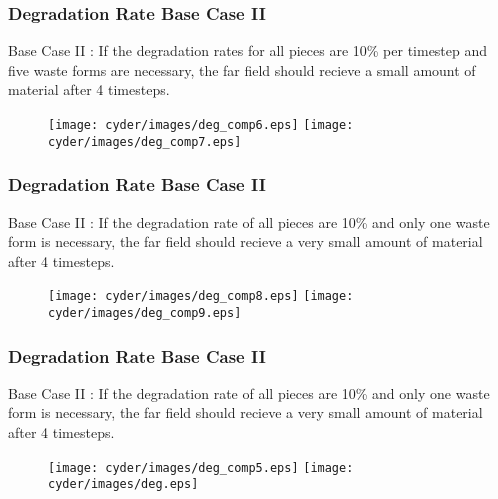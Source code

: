 \begin{frame}
  \frametitle{Degradation Rate Base Case II}
  Base Case II : If the degradation rates for all pieces are 10\% per timestep and 
  five waste forms are necessary, the far field should recieve a  small amount
  of material after 4 timesteps.

  \begin{figure}[htbp!]
    \begin{center}
      \texttt{[image: cyder/images/deg\_comp6.eps]}
      \texttt{[image: cyder/images/deg\_comp7.eps]}
    \end{center}
  \end{figure}
\end{frame}

\begin{frame}
  \frametitle{Degradation Rate Base Case II}
  Base Case II : If the degradation rate of all pieces are 10\% and only one 
  waste form is necessary, the far field should recieve a very small amount
  of material after 4 timesteps.

  \begin{figure}[htbp!]
    \begin{center}
      \texttt{[image: cyder/images/deg\_comp8.eps]}
      \texttt{[image: cyder/images/deg\_comp9.eps]}
    \end{center}
  \end{figure}
\end{frame}

\begin{frame}
  \frametitle{Degradation Rate Base Case II}
  Base Case II : If the degradation rate of all pieces are 10\% and only one 
  waste form is necessary, the far field should recieve a very small amount
  of material after 4 timesteps.

  \begin{figure}[htbp!]
    \begin{center}
      \texttt{[image: cyder/images/deg\_comp5.eps]}
      \texttt{[image: cyder/images/deg.eps]}
    \end{center}
  \end{figure}
\end{frame}

